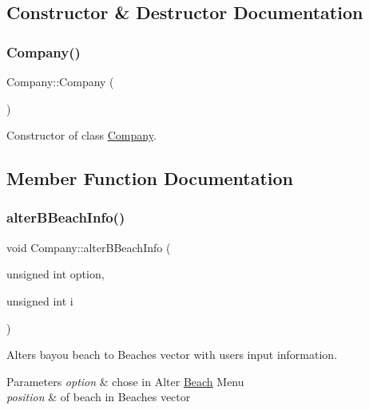 \subsection{Constructor \& Destructor Documentation}
\mbox{\label{class_company_a29937dda711b09df306ae7ca9b3d6b42}} 
\subsubsection{\texorpdfstring{Company()}{Company()}}
{\footnotesize\ttfamily Company\+::\+Company (\begin{DoxyParamCaption}{ }\end{DoxyParamCaption})}

Constructor of class \hyperlink{class_company}{Company}. 

\subsection{Member Function Documentation}
\mbox{\label{class_company_a77499b6ff8a4913bdb00843613467e56}} 
\subsubsection{\texorpdfstring{alter\+B\+Beach\+Info()}{alterBBeachInfo()}}
{\footnotesize\ttfamily void Company\+::alter\+B\+Beach\+Info (\begin{DoxyParamCaption}\item[{unsigned int}]{option,  }\item[{unsigned int}]{i }\end{DoxyParamCaption})}



Alters bayou beach to Beaches\textquotesingle{} vector with user\textquotesingle{}s input information. 


\begin{DoxyParams}{Parameters}
{\em option} & chose in Alter \hyperlink{class_beach}{Beach} Menu \\
\hline
{\em position} & of beach in Beaches\textquotesingle{} vector \\
\hline
\end{DoxyParams}
\mbox{\label{class_company_a584718d76eabe565779c41f3d047eb77}} 
